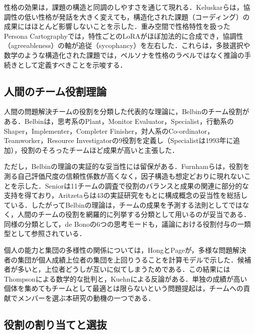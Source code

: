 性格の効果は，課題の構造と同調のしやすさを通じて現れる．Keluskarら\cite{keluskar2026personality}は，協調性の低い性格が発話を大きく変えても，構造化された課題（コーディング）の成果にはほとんど影響しないことを示した．重み空間で性格特性を扱ったPersona Cartography\cite{baines2026cartography}では，特性ごとのLoRAがほぼ加法的に合成でき，協調性（agreeableness）の軸が追従（sycophancy）を左右した．これらは，多肢選択や数学のような構造化された課題では，ペルソナを性格のラベルではなく推論の手続きとして定義すべきことを示唆する．

\subsection{人間のチーム役割理論}
\label{sec:2.2.2}

人間の問題解決チームの役割を分類した代表的な理論に，Belbinのチーム役割がある\cite{belbin1981management,belbin1993team}．Belbinは，思考系のPlant，Monitor Evaluator，Specialist，行動系のShaper，Implementer，Completer Finisher，対人系のCo-ordinator，Teamworker，Resource Investigatorの9役割を定義し（Specialistは1993年に追加），役割のそろったチームほど成果が高いと主張した．

ただし，Belbinの理論の実証的な妥当性には留保がある．Furnhamら\cite{furnham1993psychometric}は，役割を測る自己評価尺度の信頼性係数が高くなく，因子構造も想定どおりに現れないことを示した．Senior\cite{senior1997team}は11チームの調査で役割のバランスと成果の関連に部分的な支持を得ており，Aritzetaら\cite{aritzeta2007belbin}は43の実証研究をもとに構成概念の妥当性を総括している．したがってBelbinの理論は，チームの成果を予測する法則としてではなく，人間のチームの役割を網羅的に列挙する分類として用いるのが妥当である．同様の分類として，de Bonoの6つの思考モード\cite{debono1985six}も，議論における役割付与の一類型として参照されている\cite{motger2026madsurvey}．

個人の能力と集団の多様性の関係については，HongとPage\cite{hong2004groups}が，多様な問題解決者の集団が個人成績上位者の集団を上回りうることを計算モデルで示した．候補者が多いと，上位者どうしが互いに似てしまうためである．この結果にはThompson\cite{thompson2014does}による数学的な批判と，Kuehn\cite{kuehn2017diversity}による反論がある．単独の成績が高い個体を集めてもチームとして最適とは限らないという問題提起は，チームへの貢献でメンバーを選ぶ本研究の動機の一つである．

\subsection{役割の割り当てと選抜}
\label{sec:2.2.3}

